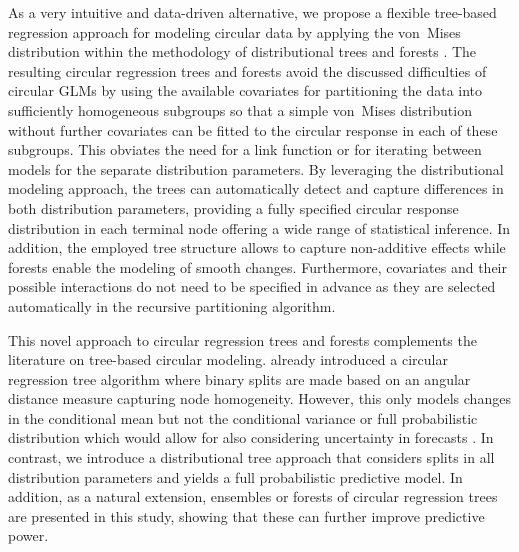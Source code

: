 \documentclass{statsoc}
\begin{document}
As a very intuitive and data-driven alternative, we propose a flexible
tree-based regression approach for modeling circular data by applying the
von~Mises distribution within the methodology of distributional trees and
forests \citep{Schlosser+Hothorn+Stauffer:2019}. The resulting circular
regression trees and forests avoid the discussed difficulties of circular GLMs
by using the available covariates for partitioning the data into sufficiently
homogeneous subgroups so that a simple von~Mises distribution without further
covariates can be fitted to the circular response in each of these subgroups.
This obviates the need for a link function or for iterating between models for
the separate distribution parameters. By leveraging the distributional modeling
approach, the trees can automatically detect and capture differences in both
distribution parameters, providing a fully specified circular response
distribution in each terminal node offering a wide range of statistical
inference. In addition, the employed tree structure allows to capture
non-additive effects while forests enable the modeling of smooth changes.
Furthermore, covariates and their possible interactions do not need to be
specified in advance as they are selected automatically in the recursive
partitioning algorithm.

This novel approach to circular regression trees and forests complements the
literature on tree-based circular modeling. \cite{Lund:2002} already introduced
a circular regression tree algorithm where binary splits are made based on an
angular distance measure capturing node homogeneity. However, this only models
changes in the conditional mean but not the conditional variance or full
probabilistic distribution which would allow for also considering uncertainty
in forecasts \citep{Gneiting:2008}. In contrast, we introduce a distributional
tree approach that considers splits in all distribution parameters and yields a
full probabilistic predictive model. In addition, as a natural extension,
ensembles or forests of circular regression trees are presented in this study,
showing that these can further improve predictive power.
\end{document}

